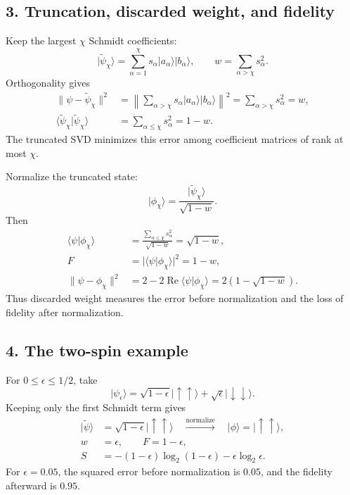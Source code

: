 \documentclass[11pt]{article}
\newcommand{\ket}[1]{\lvert #1\rangle}
\begin{document}
\newpage
\subsection*{3. Truncation, discarded weight, and fidelity}
Keep the largest $\chi$ Schmidt coefficients:
\begin{equation}
\ket{\widetilde\psi_\chi}=\sum_{\alpha=1}^\chi s_\alpha\ket{a_\alpha}\ket{b_\alpha},
\qquad w=\sum_{\alpha>\chi}s_\alpha^2.
\end{equation}
Orthogonality gives
\begin{align}
\|\psi-\widetilde\psi_\chi\|^2
&=\left\|\sum_{\alpha>\chi}s_\alpha\ket{a_\alpha}\ket{b_\alpha}\right\|^2
=\sum_{\alpha>\chi}s_\alpha^2=w,\\
\langle\widetilde\psi_\chi|\widetilde\psi_\chi\rangle
&=\sum_{\alpha\leq\chi}s_\alpha^2=1-w.
\end{align}
The truncated SVD minimizes this error among coefficient matrices of rank at most $\chi$.

Normalize the truncated state:
\begin{equation}
\ket{\phi_\chi}=\frac{\ket{\widetilde\psi_\chi}}{\sqrt{1-w}}.
\end{equation}
Then
\begin{align}
\langle\psi|\phi_\chi\rangle
&=\frac{\sum_{\alpha\leq\chi}s_\alpha^2}{\sqrt{1-w}}
=\sqrt{1-w},\\
F&=|\langle\psi|\phi_\chi\rangle|^2=1-w,\\
\|\psi-\phi_\chi\|^2&=2-2\operatorname{Re}\langle\psi|\phi_\chi\rangle
=2(1-\sqrt{1-w}).
\end{align}
Thus discarded weight measures the error before normalization and the loss of fidelity after normalization.

\subsection*{4. The two-spin example}
For $0\leq\epsilon\leq1/2$, take
\begin{equation}
\ket{\psi_\epsilon}=\sqrt{1-\epsilon}\ket{\uparrow\uparrow}
+\sqrt\epsilon\ket{\downarrow\downarrow}.
\end{equation}
Keeping only the first Schmidt term gives
\begin{align}
\ket{\widetilde\psi}&=\sqrt{1-\epsilon}\ket{\uparrow\uparrow}
\quad\xrightarrow{\text{normalize}}\quad\ket{\phi}=\ket{\uparrow\uparrow},\\
w&=\epsilon,\qquad F=1-\epsilon,\\
S&=-(1-\epsilon)\log_2(1-\epsilon)-\epsilon\log_2\epsilon.
\end{align}
For $\epsilon=0.05$, the squared error before normalization is $0.05$, and the fidelity afterward is $0.95$.
\end{document}
